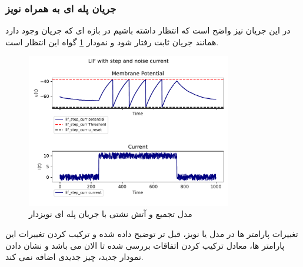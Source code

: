 \documentclass{article}
\begin{document}
            \subsubsection{جریان پله ای به همراه نویز}
                در این جریان نیز واضح است که انتظار داشته باشیم در بازه ای که جریان وجود دارد همانند جریان ثابت رفتار شود و نمودار
                \ref{fig:lif-step-noise-curr}
                گواه این انتظار است.
                \begin{figure}[H]
                    \centering
                    \includegraphics[width=0.8\textwidth]{plots/LIF with step and noise current.pdf} 
                    \caption{مدل تجمیع و آتش نشتی با جریان پله ای نویزدار}
                    \label{fig:lif-step-noise-curr}
                \end{figure}
                تغییرات پارامتر ها در مدل یا نویز، قبل تر توضیح داده شده و ترکیب کردن تغییرات این پارامتر ها، معادل ترکیب کردن اتفاقات بررسی شده تا الان می باشد و نشان دادن نمودار جدید، چیز جدیدی اضافه نمی کند.
\end{document}
